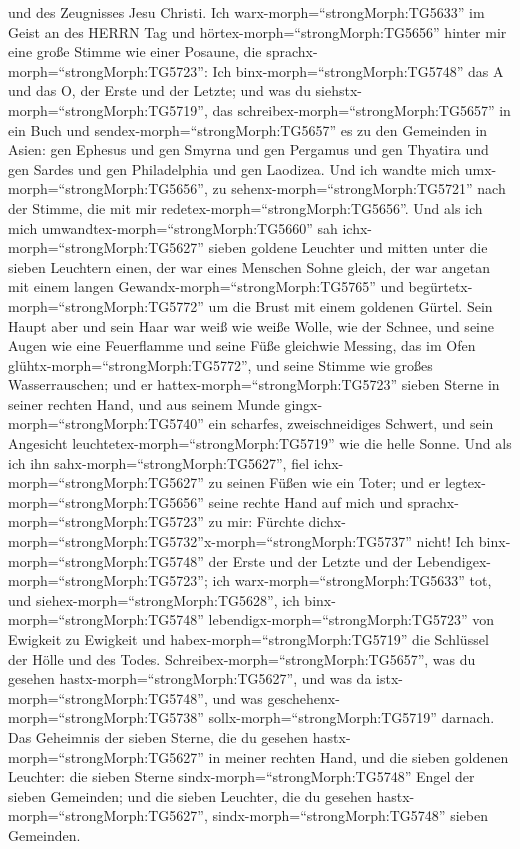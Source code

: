 und des Zeugnisses Jesu Christi.  Ich
warx-morph=``strongMorph:TG5633'' im Geist an des HERRN Tag und
hörtex-morph=``strongMorph:TG5656'' hinter mir eine große Stimme wie
einer Posaune,  die sprachx-morph=``strongMorph:TG5723'':
Ich binx-morph=``strongMorph:TG5748'' das A und das O, der Erste und der
Letzte; und was du siehstx-morph=``strongMorph:TG5719'', das
schreibex-morph=``strongMorph:TG5657'' in ein Buch und
sendex-morph=``strongMorph:TG5657'' es zu den Gemeinden in Asien: gen
Ephesus und gen Smyrna und gen Pergamus und gen Thyatira und gen Sardes
und gen Philadelphia und gen Laodizea.  Und ich wandte mich
umx-morph=``strongMorph:TG5656'', zu sehenx-morph=``strongMorph:TG5721''
nach der Stimme, die mit mir redetex-morph=``strongMorph:TG5656''. Und
als ich mich umwandtex-morph=``strongMorph:TG5660'' sah
ichx-morph=``strongMorph:TG5627'' sieben goldene Leuchter 
und mitten unter die sieben Leuchtern einen, der war eines Menschen
Sohne gleich, der war angetan mit einem langen
Gewandx-morph=``strongMorph:TG5765'' und
begürtetx-morph=``strongMorph:TG5772'' um die Brust mit einem goldenen
Gürtel.  Sein Haupt aber und sein Haar war weiß wie weiße
Wolle, wie der Schnee, und seine Augen wie eine Feuerflamme
 und seine Füße gleichwie Messing, das im Ofen
glühtx-morph=``strongMorph:TG5772'', und seine Stimme wie großes
Wasserrauschen;  und er hattex-morph=``strongMorph:TG5723''
sieben Sterne in seiner rechten Hand, und aus seinem Munde
gingx-morph=``strongMorph:TG5740'' ein scharfes, zweischneidiges
Schwert, und sein Angesicht leuchtetex-morph=``strongMorph:TG5719'' wie
die helle Sonne.  Und als ich ihn
sahx-morph=``strongMorph:TG5627'', fiel
ichx-morph=``strongMorph:TG5627'' zu seinen Füßen wie ein Toter; und er
legtex-morph=``strongMorph:TG5656'' seine rechte Hand auf mich und
sprachx-morph=``strongMorph:TG5723'' zu mir: Fürchte
dichx-morph=``strongMorph:TG5732''\textbar x-morph=``strongMorph:TG5737''
nicht! Ich binx-morph=``strongMorph:TG5748'' der Erste und der Letzte
 und der Lebendigex-morph=``strongMorph:TG5723''; ich
warx-morph=``strongMorph:TG5633'' tot, und
siehex-morph=``strongMorph:TG5628'', ich
binx-morph=``strongMorph:TG5748'' lebendigx-morph=``strongMorph:TG5723''
von Ewigkeit zu Ewigkeit und habex-morph=``strongMorph:TG5719'' die
Schlüssel der Hölle und des Todes. 
Schreibex-morph=``strongMorph:TG5657'', was du gesehen
hastx-morph=``strongMorph:TG5627'', und was da
istx-morph=``strongMorph:TG5748'', und was
geschehenx-morph=``strongMorph:TG5738''
sollx-morph=``strongMorph:TG5719'' darnach.  Das Geheimnis
der sieben Sterne, die du gesehen hastx-morph=``strongMorph:TG5627'' in
meiner rechten Hand, und die sieben goldenen Leuchter: die sieben Sterne
sindx-morph=``strongMorph:TG5748'' Engel der sieben Gemeinden; und die
sieben Leuchter, die du gesehen hastx-morph=``strongMorph:TG5627'',
sindx-morph=``strongMorph:TG5748'' sieben Gemeinden.

